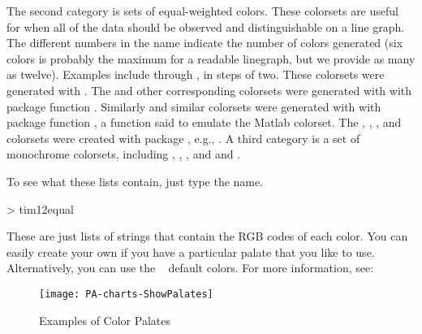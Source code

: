 \documentclass[12pt,letterpaper,english]{article}
\begin{document}
The second category is sets of equal-weighted colors. These colorsets
are useful for when all of the data should be observed and distinguishable
on a line graph. The different numbers in the name indicate the number
of colors generated (six colors is probably the maximum for a readable
linegraph, but we provide as many as twelve). Examples include 
through , in steps of two. These colorsets
were generated with . The
 and other corresponding colorsets were generated
with with package  function .
Similarly  and similar colorsets were generated
with with package  function ,
a function said to emulate the Matlab colorset. The ,
, , and 
colorsets were created with package , e.g.,
. A third
category is a set of monochrome colorsets, including 
, , , and  and
.

To see what these lists contain, just type the name.

\begin{Schunk}
\begin{Sinput}
> tim12equal
\end{Sinput}
\end{Schunk}

These are just lists of strings that contain the RGB codes of each
color. You can easily create your own if you have a particular palate
that you like to use. Alternatively, you can use the \R~ default colors.
For more information, see:



%
\begin{figure}

\caption{Examples of Color Palates}

\label{fig:Examples-of-Color}

\begin{center}

\texttt{[image: PA-charts-ShowPalates]}

\end{center}
\end{figure}
\end{document}
